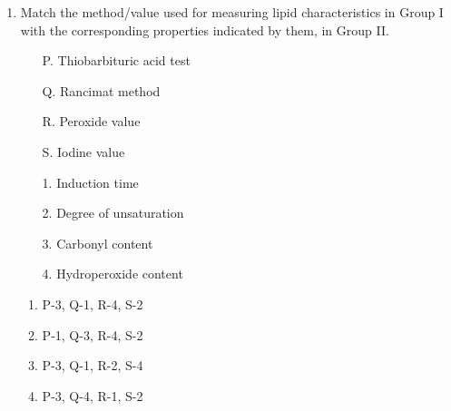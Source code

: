 \documentclass[journal,12pt,onecolumn]{IEEEtran}
\begin{document}
\begin{enumerate}
    \item \begin{minipage}{0.45\textwidth}
    Match the method/value used for measuring lipid characteristics in Group I with the corresponding properties indicated by them, in Group II.
    \begin{itemize}
        \item[P.] Thiobarbituric acid test
        \item[Q.] Rancimat method
        \item[R.] Peroxide value
        \item[S.] Iodine value
    \end{itemize}
    \end{minipage}
    \begin{minipage}{0.45\textwidth}
    \begin{itemize}
        \item[1.] Induction time
        \item[2.] Degree of unsaturation
        \item[3.] Carbonyl content
        \item[4.] Hydroperoxide content
    \end{itemize}
    \end{minipage}
    \begin{enumerate}
        \item P-3, Q-1, R-4, S-2
        \item P-1, Q-3, R-4, S-2
        \item P-3, Q-1, R-2, S-4
        \item P-3, Q-4, R-1, S-2
    \end{enumerate}


\end{enumerate}
\end{document}
